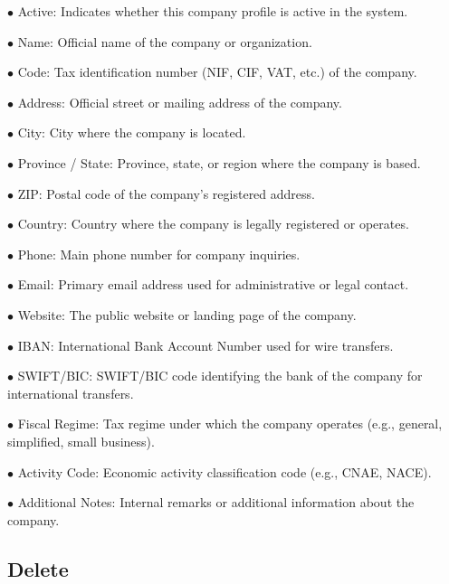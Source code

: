 \documentclass[a4paper]{article}
\begin{document}
\begin{compactitem}
\item[\color{myblue}$\bullet$] Active: Indicates whether this company profile is active in the system.
\item[\color{myblue}$\bullet$] Name: Official name of the company or organization.
\item[\color{myblue}$\bullet$] Code: Tax identification number (NIF, CIF, VAT, etc.) of the company.
\item[\color{myblue}$\bullet$] Address: Official street or mailing address of the company.
\item[\color{myblue}$\bullet$] City: City where the company is located.
\item[\color{myblue}$\bullet$] Province / State: Province, state, or region where the company is based.
\item[\color{myblue}$\bullet$] ZIP: Postal code of the company’s registered address.
\item[\color{myblue}$\bullet$] Country: Country where the company is legally registered or operates.
\item[\color{myblue}$\bullet$] Phone: Main phone number for company inquiries.
\item[\color{myblue}$\bullet$] Email: Primary email address used for administrative or legal contact.
\item[\color{myblue}$\bullet$] Website: The public website or landing page of the company.
\item[\color{myblue}$\bullet$] IBAN: International Bank Account Number used for wire transfers.
\item[\color{myblue}$\bullet$] SWIFT/BIC: SWIFT/BIC code identifying the bank of the company for international transfers.
\item[\color{myblue}$\bullet$] Fiscal Regime: Tax regime under which the company operates (e.g., general, simplified, small business).
\item[\color{myblue}$\bullet$] Activity Code: Economic activity classification code (e.g., CNAE, NACE).
\item[\color{myblue}$\bullet$] Additional Notes: Internal remarks or additional information about the company.
\end{compactitem}

\hypertarget{toc45}{}
\subsection{Delete}
\end{document}
